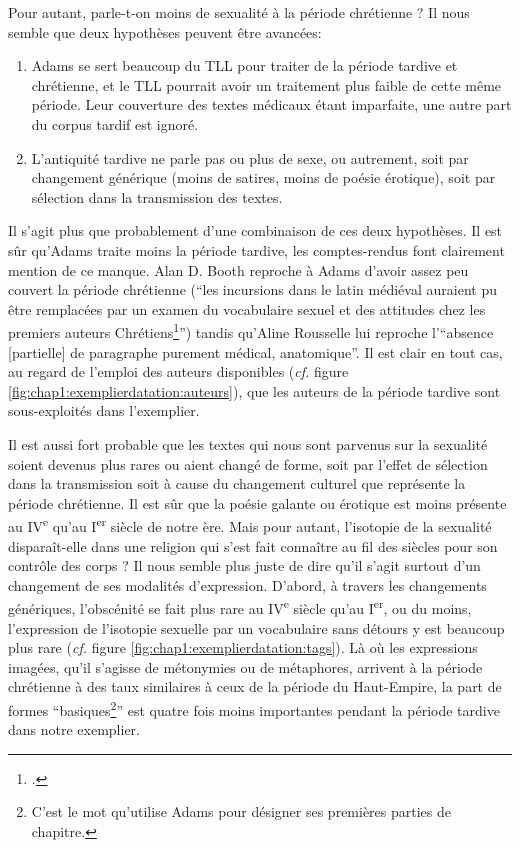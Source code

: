 Pour autant, parle-t-on moins de sexualité à la période chrétienne ? Il nous semble que deux hypothèses peuvent être avancées:
\begin{enumerate}
    \item Adams se sert beaucoup du TLL pour traiter de la période tardive et chrétienne, et le TLL pourrait avoir un traitement plus faible de cette même période. Leur couverture des textes médicaux étant imparfaite, une autre part du corpus tardif est ignoré.
    \item L'antiquité tardive ne parle pas ou plus de sexe, ou autrement, soit par changement générique (moins de satires, moins de poésie érotique), soit par sélection dans la transmission des textes.
\end{enumerate}

Il s'agit plus que probablement d'une combinaison de ces deux hypothèses. Il est sûr qu'Adams traite moins la période tardive, les comptes-rendus font clairement mention de ce manque. Alan D. Booth reproche à Adams d'avoir assez peu couvert la période chrétienne (\enquote{les incursions dans le latin médiéval auraient pu être remplacées par un examen du vocabulaire sexuel et des attitudes chez les premiers auteurs Chrétiens\footcite{booth_adams}}) tandis qu'Aline Rousselle lui reproche l'\enquote{absence [partielle] de paragraphe purement médical, anatomique}. Il est clair en tout cas, au regard de l'emploi des auteurs disponibles (\textit{cf.} figure \ref{fig:chap1:exemplierdatation:auteurs}), que les auteurs de la période tardive sont sous-exploités dans l'exemplier.

Il est aussi fort probable que les textes qui nous sont parvenus sur la sexualité soient devenus plus rares ou aient changé de forme, soit par l'effet de sélection dans la transmission soit à cause du changement culturel que représente la période chrétienne. Il est sûr que la poésie galante ou érotique est moins présente au IV\textsuperscript{e} qu'au I\textsuperscript{er} siècle de notre ère. Mais pour autant, l'isotopie de la sexualité disparaît-elle dans une religion qui s'est fait connaître au fil des siècles pour son contrôle des corps ? Il nous semble plus juste de dire qu'il s'agit surtout d'un changement de ses modalités d'expression. D'abord, à travers les changements génériques, l'obscénité se fait plus rare au IV\textsuperscript{e} siècle qu'au I\textsuperscript{er}, ou du moins, l'expression de l'isotopie sexuelle par un vocabulaire sans détours y est beaucoup plus rare (\textit{cf.} figure \ref{fig:chap1:exemplierdatation:tags}). Là où les expressions imagées, qu'il s'agisse de métonymies ou de métaphores, arrivent à la période chrétienne à des taux similaires à ceux de la période du Haut-Empire, la part de formes \enquote{basiques\footnote{C'est le mot qu'utilise Adams pour désigner ses premières parties de chapitre.}} est quatre fois moins importantes pendant la période tardive dans notre exemplier.


